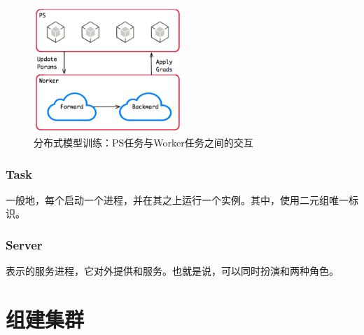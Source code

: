 \begin{content}
\begin{figure}[H]
\centering
\includegraphics[width=0.5\textwidth]{figures/py-dist-ps-worker.png}
\caption{分布式模型训练：PS任务与Worker任务之间的交互}
 \label{fig:py-dist-ps-worker}
\end{figure}

\subsubsection{Task}

一般地，每个启动一个进程，并在其之上运行一个实例。其中，使用二元组唯一标识。

\subsubsection{Server}

表示的服务进程，它对外提供和服务。也就是说，可以同时扮演和两种角色。

\end{content}

\section{组建集群}

